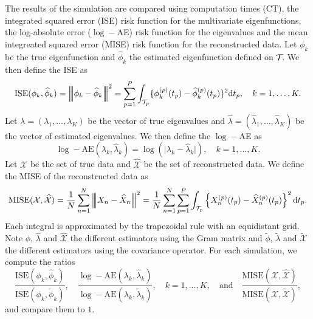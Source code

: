 The results of the simulation are compared using computation times (CT), the integrated squared error (ISE) risk function for the multivariate eigenfunctions, the log-absolute error ($\log-$AE) risk function for the eigenvalues and the mean integreated squared error (MISE) risk function for the reconstructed data. Let $\phi_k$ be the true eigenfunction and $\widehat{\phi}_k$ the estimated eigenfunction defined on $\mathcal{T}_{}$. We then define the ISE as 
\begin{equation}\label{eq:ise_eigenfunctions}
    \text{ISE}(\phi_k, \widehat{\phi}_k) = \left|\!\left|\!\left|\phi_k - \widehat{\phi}_k\right|\!\right|\!\right|^2 = \sum_{p = 1}^P \int_{\mathcal{T}_{p}} \{\phi^{(p)}_k(t_p) - \widehat{\phi}^{(p)}_k(t_p)\}^2 {\rm d} t_p, \quad k = 1, \dots, K.
\end{equation}
Let $\lambda = (\lambda_1, \dots, \lambda_K)$ be the vector of true eigenvalues and $\widehat{\lambda} = (\widehat{\lambda}_1, \dots, \widehat{\lambda}_K)$ be the vector of estimated eigenvalues. We then define the $\log-$AE as 
\begin{equation}\label{eq:mse_eigenvalues}
    \log-\text{AE}(\lambda_k, \widehat{\lambda}_k) = \log(\lvert \lambda_k - \widehat{\lambda}_k\rvert), \quad k = 1, \dots, K.
\end{equation}
Let $\mathcal{X}$ be the set of true data and $\widehat{\mathcal{X}}$ be the set of reconstructed data. We define the MISE of the reconstructed data as
\begin{equation}\label{eq:mise_reconstructed_data}
    \text{MISE}(\mathcal{X}, \widehat{\mathcal{X}}) = \frac{1}{N}\sum_{n = 1}^N \left|\!\left|\!\left|X_n - \widehat{X}_n\right|\!\right|\!\right|^2 = \frac{1}{N}\sum_{n = 1}^N \sum_{p = 1}^P \int_{\mathcal{T}_{p}} \left\{X_n^{(p)}(t_p) - \widehat{X}_n^{(p)}(t_p) \right\}^2 {\rm d} t_p.
\end{equation}
Each integral is approximated by the trapezoidal rule with an equidistant grid. Note $\widehat{\phi}$, $\widehat{\lambda}$ and $\widehat{\mathcal{X}}$ the different estimators using the Gram matrix and $\widetilde{\phi}$, $\widetilde{\lambda}$ and $\widetilde{\mathcal{X}}$ the different estimators using the covariance operator. For each simulation, we compute the ratios
\begin{equation}
    \frac{\text{ISE}(\phi_k, \widehat{\phi}_k)}{\text{ISE}(\phi_k, \widetilde{\phi}_k)}, \quad \frac{\log -\text{AE}(\lambda_k, \widehat{\lambda}_k)}{\log-\text{AE}(\lambda_k, \widetilde{\lambda}_k)},\quad k = 1, \dots, K, \quad\text{and}\quad \frac{\text{MISE}(\mathcal{X}, \widehat{\mathcal{X}})}{\text{MISE}(\mathcal{X}, \widetilde{\mathcal{X}})},
\end{equation}
and compare them to $1$.


